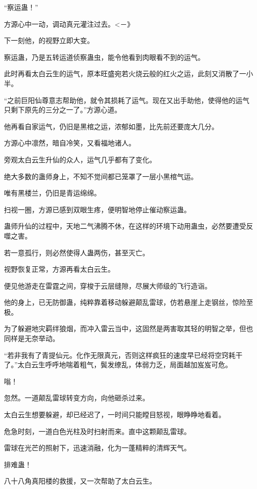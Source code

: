 
\begin{this_body}

“察运蛊！”

方源心中一动，调动真元灌注过去。<－》

下一刻他，的视野立即大变。

察运蛊，乃是五转运道侦察蛊虫，能令他看到肉眼看不到的运气。

此时再看太白云生的运气，原本旺盛宛若火烧云般的红火之运，此刻又消散了一小半。

“之前巨阳仙尊意志帮助他，就令其损耗了运气。现在又出手助他，使得他的运气只剩下原先的三分之一了。”方源心道。

他再看自家运气，仍旧是黑棺之运，浓郁如墨，比先前还要庞大几分。

方源心中凛然，暗自冷笑，又看福地诸人。

旁观太白云生升仙的众人，运气几乎都有了变化。

绝大多数的蛊师身上，不知不觉间都已笼罩了一层小黑棺气运。

唯有黑楼兰，仍旧是青运绵绵。

扫视一圈，方源已感到双眼生疼，便明智地停止催动察运蛊。

蛊师升仙的过程中，天地二气沸腾不休，在这样的环境下动用蛊虫，必然要遭受反噬之害。

若一意孤行，则必然使得人蛊两伤，甚至灭亡。

视野恢复正常，方源再看太白云生。

便见他游走在雷霆之间，穿梭于云层缝隙，尽展大师级的飞行造诣。

他的身上，已无防御蛊，纯粹靠着移动躲避颠乱雷球，仿若悬崖上走钢丝，惊险至极。

为了躲避地灾羁绊狼烟，而冲入雷云当中，这固然是两害取其轻的明智之举，但也同样是无奈举动。

“若非我有了青提仙元。化作无限真元，否则这样疯狂的速度早已经将空窍耗干了。”太白云生呼呼地喘着粗气，鬓发缭乱，体弱力乏，局面越加岌岌可危。

嗡！

忽然。一道颠乱雷球转变方向，向他砸杀过来。

太白云生想要躲避，却已经迟了，一时间只能瞠目怒视，眼睁睁地看着。

危急时刻，一道白色光柱及时扫射而来。直中这颗颠乱雷球。

雷球在光芒的照射下，迅速消融，化为一蓬精粹的清辉天气。

排难蛊！

八十八角真阳楼的救援，又一次帮助了太白云生。


\end{this_body}
